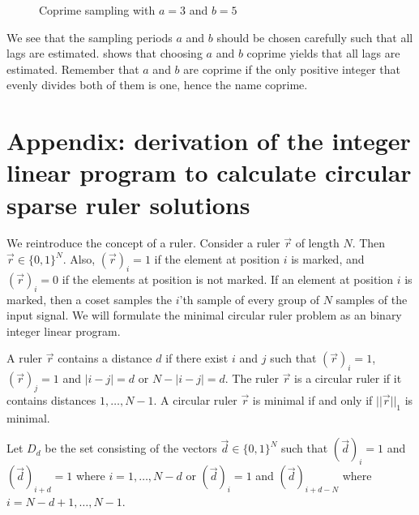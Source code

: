 \documentclass[a4paper, openany, oneside]{memoir}
\begin{document}
\begin{figure}
\caption{Coprime sampling with $a=3$ and $b=5$}\label{tkz:coprime_ruler}
\end{figure}

We see that the sampling periods $a$ and $b$ should be chosen carefully such that all lags are estimated. \cite{pal2011coprime} shows that choosing $a$ and $b$ coprime yields that all lags are estimated. Remember that $a$ and $b$ are coprime if the only positive integer that evenly divides both of them is one, hence the name coprime.




\section{Appendix: derivation of the integer linear program to calculate circular sparse ruler solutions}\label{ap:derivation_ILP}
We reintroduce the concept of a ruler. Consider a ruler $\vec{r}$ of length $N$. Then $\vec{r} \in \{0,1\}^N$. Also, $(\vec{r})_i = 1$ if the element at position $i$ is marked, and $(\vec{r})_i = 0$ if the elements at position is not marked. If an element at position $i$ is marked, then a coset samples the $i$'th sample of every group of $N$ samples of the input signal. We will formulate the minimal circular ruler problem as an binary integer linear program.

A ruler $\vec{r}$ contains a distance $d$ if there exist $i$ and $j$ such that $(\vec{r})_i = 1$, $(\vec{r})_j = 1$ and $|i-j| = d$ or  $N-|i-j| = d$. The ruler $\vec{r}$ is a circular ruler if it contains distances $ 1, \ldots, N - 1$. A circular ruler $\vec{r}$ is minimal if and only if $||\vec{r}||_1$ is minimal.

Let $D_d$ be the set consisting of the vectors $\vec{d} \in \{0,1\}^N$ such that $(\vec{d})_i=1$ and $(\vec{d})_{i+d}=1$ where $i = 1,\ldots,N-d$ or $(\vec{d})_i=1$ and $(\vec{d})_{i+d-N}$ where $i = N-d+1,\ldots,N-1$.
\end{document}
